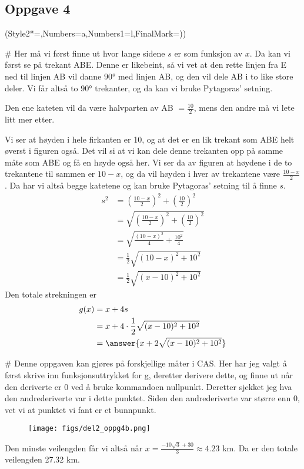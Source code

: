 \subsection*{Oppgave 4}

\begin{easylist}[enumerate]
	\ListProperties(Style2*=,Numbers=a,Numbers1=l,FinalMark={)})
	
	# Her må vi først finne ut hvor lange sidene $s$ er som funksjon av $x$. 
	Da kan vi først se på trekant ABE. 
	Denne er likebeint, så vi vet at den rette linjen fra E ned til linjen AB vil danne $\ang{90}$ med linjen AB, og den vil dele AB i to like store deler. 
	Vi får altså to $\ang{90}$ trekanter, og da kan vi bruke Pytagoras' setning. 
	
	Den ene kateten vil da være halvparten av AB $ = \frac{10}{2}$, mens den andre må vi lete litt mer etter.
	
	Vi ser at høyden i hele firkanten er 10, og at det er en lik trekant som ABE helt øverst i figuren også. 
	Det vil si at vi kan dele denne trekanten opp på samme måte som ABE og få en høyde også her. 
	Vi ser da av figuren at høydene i de to trekantene til sammen er $10-x$, og da vil høyden i hver av trekantene være $\frac{10-x}{2}$. 
	Da har vi altså begge katetene og kan bruke Pytagoras' setning til å finne $s$.
	\begin{align*}
		s^2 &= \left (\frac{10-x}{2} \right)^2	+ \left(\frac{10}{2} \right)^2 \\
		 & = \sqrt{\left (\frac{10-x}{2} \right)^2 + \left(\frac{10}{2} \right)^2} \\
		 & = \sqrt{\frac{(10-x)^2}{4} + \frac{10^2}{4}} \\
		 & = \frac{1}{2} \sqrt{(10-x)^2 + 10^2} \\
		 & = \frac{1}{2} \sqrt{(x-10)^2 + 10^2} 		
	\end{align*}
	Den totale strekningen er
	\begin{align*}
			g(x) & = x + 4s \\
			& = x + 4 \cdot  \frac{1}{2} \sqrt{(x-10)^2 + 10^2} \\
			& = \answer{x + 2\sqrt{(x-10)^2 + 10^2}}	
	\end{align*}
	
	
	# Denne oppgaven kan gjøres på forskjellige måter i CAS. Her har jeg valgt å først skrive inn funksjonsuttrykket for g, deretter derivere dette, og finne ut når den deriverte er $0$ ved å bruke kommandoen nullpunkt. Deretter sjekket jeg hva den andrederiverte var i dette punktet. Siden den andrederiverte var større enn $0$, vet vi at punktet vi fant er et bunnpunkt.
	
	
	\begin{figure}[ht!]
		\centering
		\texttt{[image: figs/del2\_oppg4b.png]}
	\end{figure}
	
	Den minste veilengden får vi altså når $x = \frac{-10 \sqrt{3} + 30}{3} \approx 4.23$ km. Da er den totale veilengden 27.32 km.
\end{easylist}




